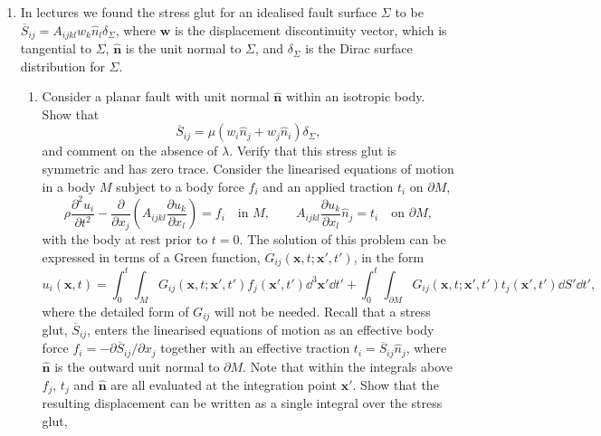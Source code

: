 \begin{enumerate}
\item In lectures we found the stress glut for an idealised fault surface $\Sigma$ to be $\overline{S}_{ij}=A_{ijkl}w_{k}\hat{n}_{l}\delta_{\Sigma}$, where $\mathbf{w}$ is the displacement discontinuity vector, which is tangential to $\Sigma$, $\hat{\mathbf{n}}$ is the unit normal to $\Sigma$, and $\delta_{\Sigma}$ is the Dirac surface distribution for $\Sigma$.
\begin{enumerate}
    \item Consider a planar fault with unit normal $\hat{\mathbf{n}}$ within an isotropic body. Show that
    \begin{equation*}
        \overline{S}_{ij}=\mu(w_{i}\hat{n}_{j}+w_{j}\hat{n}_{i})\delta_{\Sigma},
    \end{equation*}
    and comment on the absence of $\lambda$. Verify that this stress glut is symmetric and has zero trace.
    \hardp Consider the linearised equations of motion in a body $M$ subject to a body force $f_{i}$ and an applied traction $t_{i}$ on $\partial M$,
    \begin{equation*}
        \rho\frac{\partial^{2}u_{i}}{\partial t^{2}}-\frac{\partial}{\partial x_{j}}\left(A_{ijkl}\frac{\partial u_{k}}{\partial x_{l}}\right)=f_{i}\quad\text{in }M,\qquad A_{ijkl}\frac{\partial u_{k}}{\partial x_{l}}\hat{n}_{j}=t_{i}\quad\text{on }\partial M,
    \end{equation*}
    with the body at rest prior to $t=0$. The solution of this problem can be expressed in terms of a Green function, $G_{ij}(\mathbf{x},t;\mathbf{x}',t')$, in the form
    \begin{equation*}
        u_{i}(\mathbf{x},t)=\int_{0}^{t}\int_{M}G_{ij}(\mathbf{x},t;\mathbf{x}',t')f_{j}(\mathbf{x}',t')\dd^{3}\mathbf{x}'\dd t'+\int_{0}^{t}\int_{\partial M}G_{ij}(\mathbf{x},t;\mathbf{x}',t')t_{j}(\mathbf{x}',t')\dd S'\dd t',
    \end{equation*}
    where the detailed form of $G_{ij}$ will not be needed. Recall that a stress glut, $\overline{S}_{ij}$, enters the linearised equations of motion as an effective body force $f_{i}=-\partial\overline{S}_{ij}/\partial x_{j}$ together with an effective traction $t_{i}=\overline{S}_{ij}\hat{n}_{j}$, where $\hat{\mathbf{n}}$ is the outward unit normal to $\partial M$. Note that within the integrals above $f_{j}$, $t_{j}$ and $\hat{\mathbf{n}}$ are all evaluated at the integration point $\mathbf{x}'$. Show that the resulting displacement can be written as a single integral over the stress glut,
    \begin{equation*}

\end{equation*}
\end{enumerate}
\end{enumerate}
